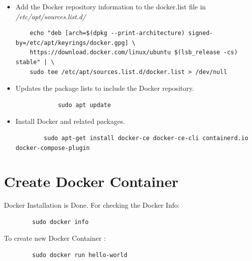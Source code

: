 \documentclass{book}
\begin{document}
\begin{itemize}
    \item Add the Docker repository information to the docker.list file in \newline
    \textit{/etc/apt/sources.list.d/}
        \begin{verbatim}
    echo "deb [arch=$(dpkg --print-architecture) signed-by=/etc/apt/keyrings/docker.gpg] \
    https://download.docker.com/linux/ubuntu $(lsb_release -cs) stable" | \
    sudo tee /etc/apt/sources.list.d/docker.list > /dev/null
        \end{verbatim}

    \item Updates the package lists to include the Docker repository.

        \begin{verbatim}
            sudo apt update
        \end{verbatim}
    
    \item Install Docker and related packages.
        \begin{verbatim}
        sudo apt-get install docker-ce docker-ce-cli containerd.io docker-compose-plugin
        \end{verbatim}
\end{itemize}


\section{Create Docker Container}
Docker Installation is Done. For checking the Docker Info: 
    \begin{verbatim}
        sudo docker info
    \end{verbatim}
To create new Docker Container :
    \begin{verbatim}
        sudo docker run hello-world
    \end{verbatim}
\end{document}
